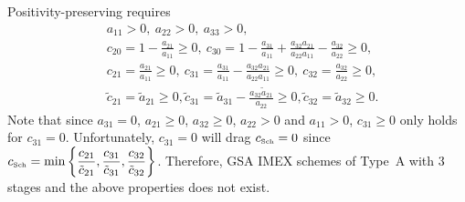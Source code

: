 Positivity-preserving requires
\begin{align*}
& a_{11} > 0, ~ a_{22} >0, ~ a_{33}>0,\\
& c_{20} = 1 - \frac{a_{21}}{a_{11}} \geq 0, ~ c_{30} = 1-\frac{a_{31}}{a_{11}} + \frac{a_{32}a_{21}}{a_{22}a_{11}} - \frac{a_{32}}{a_{22}}\geq 0, \\
& c_{21} = \frac{a_{21}}{a_{11}} \geq 0, ~ c_{31} = \frac{a_{31}}{a_{11}} - \frac{a_{32}a_{21}}{a_{22}a_{11}} \geq 0, ~ c_{32} = \frac{a_{32}}{a_{22}} \geq 0,\\
& \tilde{c}_{21} = \tilde{a}_{21} \geq 0, \tilde{c}_{31} = \tilde{a}_{31} - \frac{a_{32}\tilde{a}_{21}}{a_{22}} \geq 0, \tilde{c}_{32} = \tilde{a}_{32} \geq 0.
\end{align*}
Note that since $a_{31} = 0$, $a_{21} \geq 0$, $a_{32} \geq 0$, $a_{22} > 0$ and $a_{11} >0$, $c_{31} \geq 0$ only holds for $c_{31} = 0$.
Unfortunately, $c_{31} = 0$ will drag $c_{\mbox{\tiny Sch}} = 0$ since $c_{\mbox{\tiny Sch}} = \min \left\lbrace \dfrac{c_{21}}{\tilde{c}_{21}}, \dfrac{c_{31}}{\tilde{c}_{31}}, \dfrac{c_{32}}{\tilde{c}_{32}}\right\rbrace $.
Therefore, GSA IMEX schemes of Type~A with 3 stages and the above properties does not exist.
